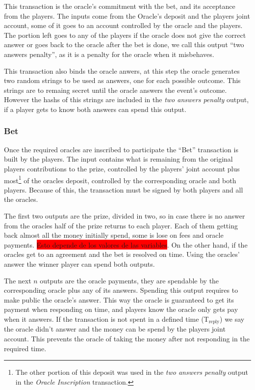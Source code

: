 This transaction is the oracle's commitment with the bet, and its acceptance
  from the players. The inputs come from the Oracle's deposit and the players
  joint account, some of it goes to an account controlled by the oracle and
  the players.
The portion left goes to any of the players if the oracle does not give the
  correct answer or goes back to the oracle after the bet is done, we call
  this output ``two answers penalty'', as it is a penalty for the oracle
  when it misbehaves.

This transaction also binds the oracle anwers, at this step the oracle generates
  two random strings to be used as answers, one for each possible outcome.
This strings are to remaing secret until the oracle answers the event's
  outcome.
However the hashs of this strings are included in the \textit{two answers
  penalty} output, if a player gets to know both answers can spend this output.

\subsubsection{Bet}

Once the required oracles are inscribed to participate the ``Bet'' transaction
  is built by the players.
 The input contains what is remaining from the original players contributions to
   the prize, controlled by the players' joint account plus most\footnote{The
  other portion of this deposit was used in the \textit{two answers penalty}
  output in the \textit{Oracle Inscription} transaction.} of the oracles
  deposit, controlled by the corresponding oracle and both players.
Because of this, the transaction must be signed by both players and all the
  oracles.

The first two outputs are the prize, divided in two, so in case there is no
  answer from the oracles half of the prize returns to each player.
Each of them getting back almost all the money initially spend, some is lose
  on fees and oracle payments. \colorbox{red}{Esto depende de los valores de
  las variables}. On the other hand, if the oracles get to an agreement and the
  bet is resolved on time. Using the oracles' answer the winner player can spend
  both outputs.

The next $n$ outputs are the oracle payments, they are spendable by the
  corresponding oracle plus any of its answers.
Spending this output requires to make public the oracle's answer. This way the
  oracle is guaranteed to get its payment when responding on time, and players
  know the oracle only gets pay when it answers.
  If the transaction is not spent in a defined time (T$_{\text{reply}}$) we say
  the oracle didn't answer and the money can be spend by the players joint
  account.
This prevents the oracle of taking the money after not responding in the
  required time.

